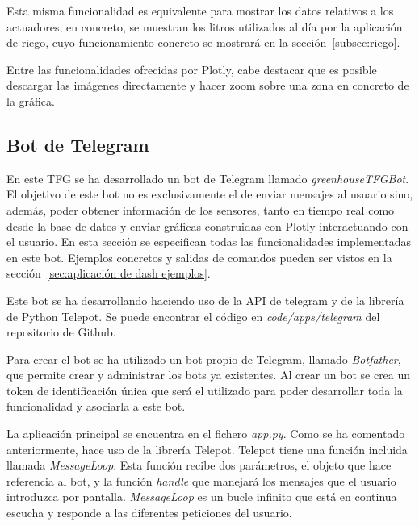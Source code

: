 \documentclass[a4paper, 12pt, oneside]{book}
\begin{document}
Esta misma funcionalidad es equivalente para mostrar los datos relativos a los actuadores, en concreto, se muestran los litros utilizados al día por la aplicación de riego, cuyo funcionamiento concreto se mostrará en la sección~\ref{subsec:riego}.

Entre las funcionalidades ofrecidas por Plotly, cabe destacar que es posible descargar las imágenes directamente y hacer zoom sobre una zona en concreto de la gráfica. 
 

\subsection{Bot de Telegram}
\label{bot de telegram}
En este TFG se ha desarrollado un bot de Telegram llamado \textit{greenhouseTFGBot}. El objetivo de este bot no es exclusivamente el de enviar mensajes al usuario sino, además, poder obtener información de los sensores, tanto en tiempo real como desde la base de datos y enviar gráficas construidas con Plotly interactuando con el usuario. En esta sección se especifican todas las funcionalidades implementadas en este bot. Ejemplos concretos y salidas de comandos pueden ser vistos en la sección~\ref{sec:aplicación de dash ejemplos}.

Este bot se ha desarrollando haciendo uso de la API de telegram y de la librería de Python Telepot. Se puede encontrar el código en \textit{code/apps/telegram} del repositorio de Github.

Para crear el bot se ha utilizado un bot propio de Telegram, llamado \textit{Botfather}, que permite crear y administrar los bots ya existentes. Al crear un bot se crea un token de identificación única que será el utilizado para poder desarrollar toda la funcionalidad y asociarla a este bot.
 
La aplicación principal se encuentra en el fichero \textit{app.py}. Como se ha comentado anteriormente, hace uso de la librería Telepot. Telepot tiene una función incluida llamada \textit{MessageLoop}. Esta función recibe dos parámetros, el objeto que hace referencia al bot, y la función \textit{handle} que manejará los mensajes que el usuario introduzca por pantalla. \textit{MessageLoop} es un bucle infinito que está en continua escucha y responde a las diferentes peticiones del usuario.
\end{document}

